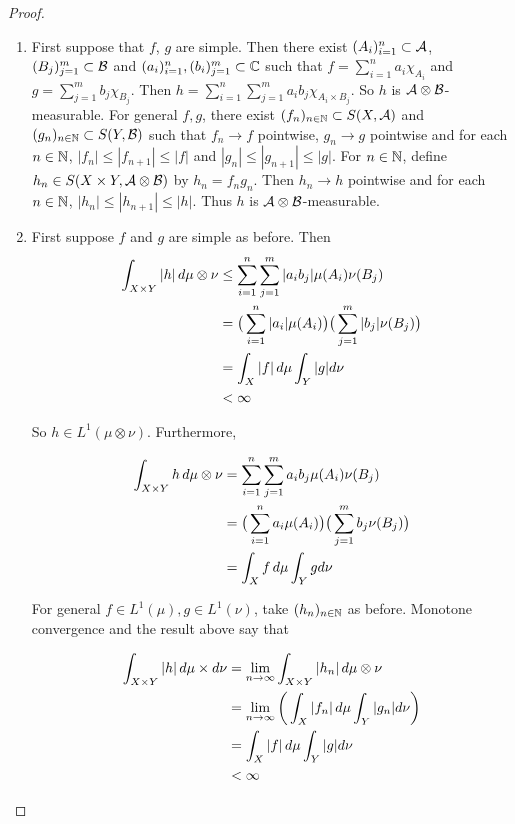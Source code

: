\documentclass{book}
\begin{document}
	\begin{proof}\
		\begin{enumerate}
			\item First suppose that $f$, $g$ are simple. Then there exist $(A_i)_{i=1}^n \subset \mathcal{A}$, $(B_j)_{j=1}^m \subset \mathcal{B}$ and $(a_i)_{i=1}^n, (b_i)_{j=1}^m \subset \mathbb{C}$ such that $f = \sum_{i=1}^n a_i \chi_{A_i}$ and $g = \sum_{j=1}^m b_j \chi_{B_j}$. Then $h = \sum_{i=1}^n \sum_{j=1}^m a_i b_j \chi_{A_i \times B_j}$. So $h$ is $\mathcal{A} \otimes \mathcal{B}$-measurable. For general $f,g$, there exist $(f_n)_{n \in \mathbb{N}} \subset S(X, \mathcal{A})$ and $(g_n)_{n \in \mathbb{N}} \subset S(Y, \mathcal{B})$ such that $f_n \rightarrow f$ pointwise, $g_n \rightarrow g$ pointwise and for each $n \in \mathbb{N}$, $|f_n| \leq |f_{n+1}| \leq |f|$ and $|g_n| \leq |g_{n+1}| \leq |g|$. For $n \in \mathbb{N}$, define $h_n \in S(X \times Y, \mathcal{A} \otimes \mathcal{B})$ by $h_n = f_n g_n$. Then $h_n \rightarrow h$ pointwise and for each $n \in \mathbb{N}$, $|h_n| \leq |h_{n+1}| \leq |h|$. Thus $h$ is $\mathcal{A} \otimes \mathcal{B}$-measurable.
			
			\item First suppose $f$ and $g$ are simple as before. Then  
			\begin{align*}
				\int_{X \times Y} |h| \, d \mu \otimes \nu 
				& \leq \sum_{i=1}^n \sum_{j=1}^m |a_i b_j| \mu(A_i) \nu(B_j)\\ 
				&= \big(\sum_{i=1}^n |a_i| \mu(A_i) \big) \big( \sum_{j=1}^m |b_j| \nu(B_j) \big)\\
				&= \int_X |f| \, d \mu \int_Y |g| d \nu\\
				&< \infty
			\end{align*}
			
			So $h \in L^1(\mu \otimes \nu)$. Furthermore, 
			
			\begin{align*}
				\int_{X \times Y} h \, d \mu \otimes \nu 
				&= \sum_{i=1}^n \sum_{j=1}^m a_i b_j \mu(A_i) \nu(B_j)\\ 
				&= \big(\sum_{i=1}^n a_i \mu(A_i) \big) \big( \sum_{j=1}^m b_j \nu(B_j) \big)\\
				&= \int_X f \, d \mu \int_Y gd \nu
			\end{align*}
			
			For general $f \in L^1(\mu), g \in L^1(\nu)$, take $(h_n)_{n \in \mathbb{N}}$ as before. Monotone convergence and the result above say that 
			
			\begin{align*}
				\int_{X \times Y} |h| \, d \mu \times d\nu 
				&= \lim \limits_{n \rightarrow \infty} \int_{X \times Y} |h_n|\, d \mu \otimes \nu\\
				&=  \lim \limits_{n \rightarrow \infty} \bigg( \int_X |f_n| \, d \mu \int_Y |g_n| d\nu \bigg) \\
				&= \int_X |f| \, d \mu \int_Y |g| d\nu\\
				& < \infty
			\end{align*}
			

\end{enumerate}
\end{proof}
\end{document}
